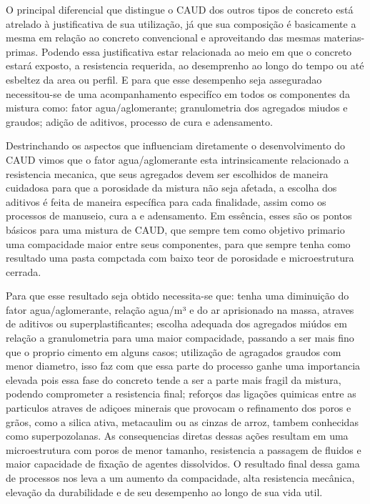 O principal diferencial que distingue o CAUD dos outros tipos de concreto está atrelado à justificativa de sua utilização, já que sua composição é basicamente a mesma em relação ao concreto convencional e aproveitando das mesmas materias-primas. Podendo essa justificativa estar relacionada ao meio em que o concreto estará exposto, a resistencia requerida, ao desemprenho ao longo do tempo ou até esbeltez da area ou perfil. E para que esse desempenho seja asseguradao necessitou-se de uma acompanhamento especifíco em todos os componentes da mistura como: fator agua/aglomerante; granulometria dos agregados miudos e graudos; adição de aditivos, processo de cura e adensamento.

Destrinchando os aspectos que influenciam diretamente o desenvolvimento do CAUD vimos que o fator agua/aglomerante esta intrinsicamente relacionado a resistencia mecanica, que seus agregados devem ser escolhidos de maneira cuidadosa para que a porosidade da mistura não seja afetada, a escolha dos aditivos é feita de maneira específica para cada finalidade, assim como os processos de manuseio, cura a e adensamento. Em essência, esses são os pontos básicos para uma mistura de CAUD, que sempre tem como objetivo primario uma compacidade maior entre seus componentes, para que sempre tenha como resultado uma pasta compctada com baixo teor de porosidade e microestrutura cerrada.

Para que esse resultado seja obtido necessita-se que: tenha uma diminuição do fator agua/aglomerante, relação agua/m³ e do ar aprisionado na massa, atraves de aditivos ou superplastificantes; escolha adequada dos agregados miúdos em relação a granulometria para uma maior compacidade, passando a ser mais fino que o proprio cimento em alguns casos; utilização de agragados graudos com menor diametro, isso faz com que essa parte do processo ganhe uma importancia elevada pois essa fase do concreto tende a ser a parte mais fragil da mistura, podendo comprometer a resistencia final; reforços das ligações quimicas entre as particulos atraves de adiçoes minerais que provocam o refinamento dos poros e grãos, como a silica ativa, metacaulim ou as cinzas de arroz, tambem conhecidas como superpozolanas. As consequencias diretas dessas ações resultam em uma microestrutura com poros de menor tamanho, resistencia a passagem de fluidos e maior capacidade de fixação de agentes dissolvidos. O resultado final dessa gama de processos nos leva a um aumento da compacidade, alta resistencia mecânica, elevação da durabilidade e de seu desempenho ao longo de sua vida util.

